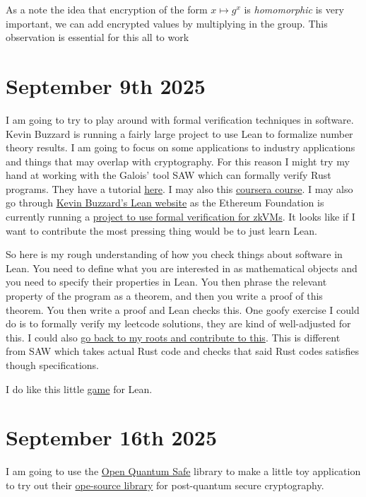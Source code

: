 \documentclass{amsart}
\theoremstyle{definition}
\begin{document}
As a note the idea that encryption of the form $x\mapsto g^x$ is \textit{homomorphic} is very important, we can add encrypted values by multiplying in the group. This observation is essential for this all to work



\section{September 9th 2025}

I am going to try to play around with formal verification techniques in software. Kevin Buzzard is running a fairly large project to use Lean to formalize number theory results. I am going to focus on some applications to industry applications and things that may overlap with cryptography. For this reason I might try my hand at working with the Galois' tool SAW which can formally verify Rust programs. They have a tutorial \href{https://galoisinc.github.io/saw-script/master/rust-verification-with-saw/index.html}{here}. I may also this \href{https://www.coursera.org/learn/introduction-to-modeling-for-formal-verification}{coursera course}. I may also go through \href{https://leanprover-community.github.io/}{Kevin Buzzard's Lean website} as the Ethereum Foundation is currently running a \href{https://verified-zkevm.org/}{project to use formal verification for zkVMs}. It looks like if I want to contribute the most pressing thing would be to just learn Lean.

So here is my rough understanding of how you check things about software in Lean. You need to define what you are interested in as mathematical objects and you need to specify their properties in Lean. You then phrase the relevant property of the program as a theorem, and then you write a proof of this theorem. You then write a proof and Lean checks this. One goofy exercise I could do is to formally verify my leetcode solutions, they are kind of well-adjusted for this. I could also \href{https://yaeldillies.github.io/Toric/?utm_source=chatgpt.com}{go back to my roots and contribute to this}. This is different from SAW which takes actual Rust code and checks that said Rust codes satisfies though specifications. 

I do like this little \href{https://www.ma.imperial.ac.uk/~buzzard/xena/natural_number_game/index2.html}{game} for Lean.

\section{September 16th 2025}

I am going to use the \href{https://openquantumsafe.org/about/}{Open Quantum Safe} library to make a little toy application to try out their \href{https://github.com/open-quantum-safe/liboqs}{ope-source library} for post-quantum secure cryptography.


\nocite{*}

{}
\end{document}
